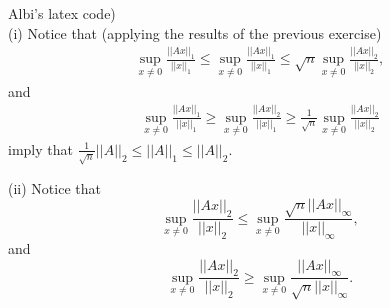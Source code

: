 \documentclass[12pt]{article}
\newenvironment{problem}[2][Problem]{\begin{trivlist}
\item[\hskip \labelsep {\bfseries #1}\hskip \labelsep {\bfseries #2.}]}{\end{trivlist}}
\theoremstyle{definition}
\theoremstyle{definition}
\theoremstyle{definition}
\theoremstyle{definition}
\begin{document}
\begin{problem}{3.28} (Albi's latex code) \\
(i)
Notice that (applying the results of the previous exercise)
\begin{align*}
    \sup_{x\neq 0}\frac{||Ax||_1}{||x||_1}\leq
    \sup_{x\neq 0}\frac{||Ax||_1}{||x||_1}\leq
    \sqrt{n}\sup_{x\neq 0}\frac{||Ax||_2}{||x||_2},
\end{align*}
and
\begin{align*}
    \sup_{x\neq 0}\frac{||Ax||_1}{||x||_1}\geq
    \sup_{x\neq 0}\frac{||Ax||_2}{||x||_1}\geq
    \frac{1}{\sqrt{n}}\sup_{x\neq 0}\frac{||Ax||_2}{||x||_2}
\end{align*}
imply that $\frac{1}{\sqrt{n}}||A||_2\leq||A||_1\leq||A||_2$.

(ii)
Notice that
\begin{equation*}
    \sup_{x\neq 0}\frac{||Ax||_2}{||x||_2}\leq
    \sup_{x\neq 0}\frac{\sqrt{n}||Ax||_\infty}{||x||_\infty},
\end{equation*}
and
\begin{equation*}
    \sup_{x\neq 0}\frac{||Ax||_2}{||x||_2}\geq
    \sup_{x\neq 0}\frac{||Ax||_\infty}{\sqrt{n}||x||_\infty}.
\end{equation*}
\end{problem}
\end{document}
